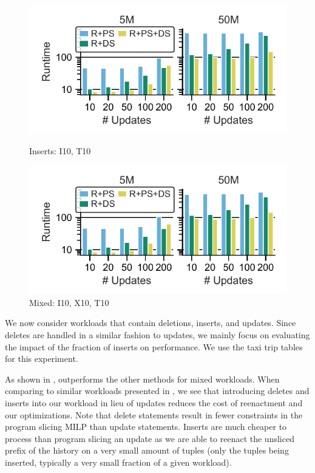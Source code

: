 \begin{figure}[t]
  \begin{minipage}[b]{0.47\linewidth}
    \centering
		\includegraphics[width=1.1\linewidth,trim=10 9 15 10, clip]{imgs/felix_inserts.pdf}
		\vspace{-6.5mm}
		\caption{Inserts: I10, T10}
		\label{fig:Inserts at I10}
	\end{minipage}
	
	\begin{minipage}[b]{0.52\linewidth}
      \centering
      \hspace{3mm}
      \includegraphics[width=0.9\linewidth,trim=30 9 15 10, clip]{imgs/felix_mixed.pdf}
		\vspace{-2.5mm}
		\caption{Mixed: I10, X10, T10}
		\label{fig:Mixed Updates at IX10}
	\end{minipage}
\end{figure}


We now consider workloads that contain deletions, inserts, and updates. Since deletes are handled in a similar fashion to updates, we mainly focus on evaluating the impact of the fraction of inserts on performance. We use the taxi trip tables for this experiment. 

As shown in , \mrdp outperforms the other methods for mixed workloads. When comparing to similar workloads presented in , we see that introducing deletes and inserts into our workload in lieu of updates reduces the cost of reenactment and our optimizations. Note that delete statements result in fewer constraints in the program slicing MILP than update statements. Inserts are much cheaper to process than program slicing an update as we are able to reenact the unsliced prefix of the history on a very small amount of tuples (only the tuples being inserted, typically a very small fraction of a given workload).


